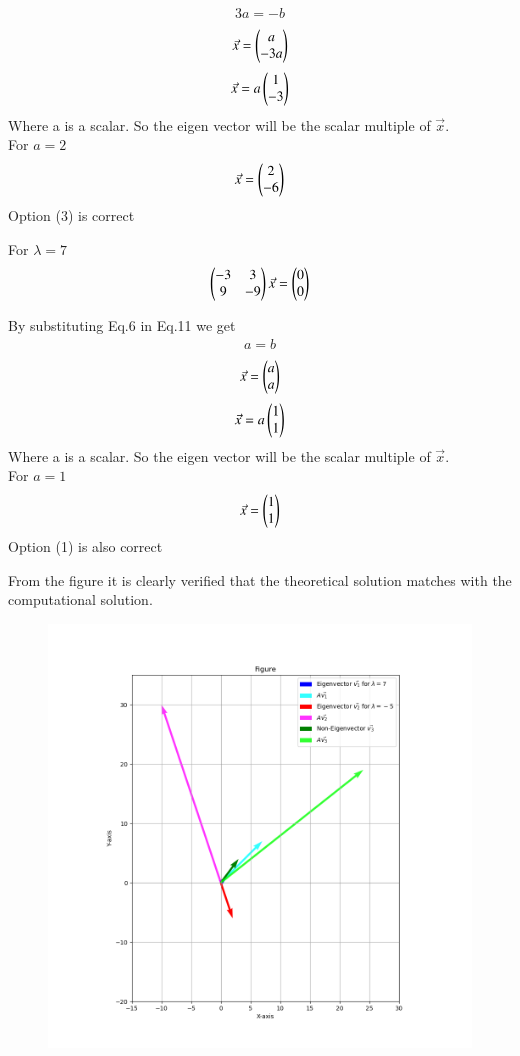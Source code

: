 \documentclass[journal]{IEEEtran}
\theoremstyle{remark}
\begin{document}
\begin{align}
  3a=-b
\end{align}
\begin{align}
    \Vec{x}=\begin{pmatrix}a\\-3a\end{pmatrix}
\end{align}
\begin{align}
    \Vec{x}=a\begin{pmatrix}1\\-3\end{pmatrix}
\end{align}
Where a is a scalar. So the eigen vector will be the scalar multiple of $\Vec{x}$.\\
For $a=2$
\begin{align}
    \Vec{x}=\begin{pmatrix}2\\-6\end{pmatrix}
\end{align}
Option (3) is correct

For  $\lambda=7$
\begin{align}
 \begin{pmatrix}-3&3\\9&-9\end{pmatrix}\Vec{x}=\begin{pmatrix}0\\0\end{pmatrix}
\end{align}

By substituting Eq.6 in Eq.11 we get
\begin{align}
    a=b
\end{align}
\begin{align}
    \Vec{x}=\begin{pmatrix}a\\a\end{pmatrix}
\end{align}
\begin{align}
    \Vec{x}=a\begin{pmatrix}1\\1\end{pmatrix}
\end{align}
Where a is a scalar. So the eigen vector will be the scalar multiple of $\Vec{x}$.\\
For $a=1$
\begin{align}
    \Vec{x}=\begin{pmatrix}1\\1\end{pmatrix}
\end{align}
Option (1) is also correct



From the figure it is clearly verified that the theoretical solution matches with the computational solution.\\
\begin{figure}[h]
    \centering
    \includegraphics[height=0.5\textheight, keepaspectratio]{figs/figure1.png}
    \label{figure_1}
\end{figure}
\end{document}
